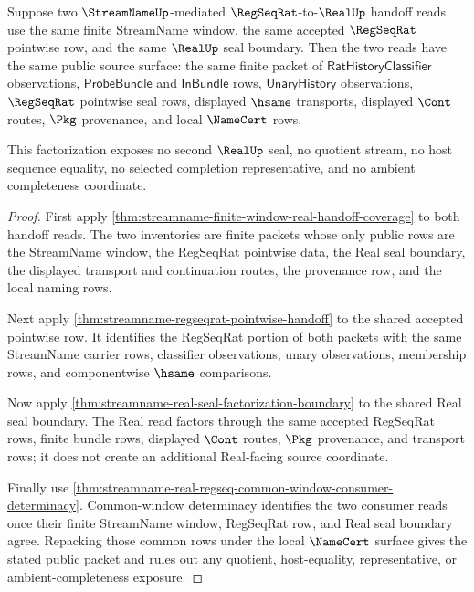 \begin{theorem}
\label{thm:streamname-regseqrat-real-window-factorization}
Suppose two $\StreamNameUp$-mediated $\RegSeqRat$-to-$\RealUp$ handoff reads use the same finite StreamName window, the same accepted $\RegSeqRat$ pointwise row, and the same $\RealUp$ seal boundary. Then the two reads have the same public source surface: the same finite packet of $\mathsf{RatHistoryClassifier}$ observations, $\mathsf{ProbeBundle}$ and $\mathsf{InBundle}$ rows, $\mathsf{UnaryHistory}$ observations, $\RegSeqRat$ pointwise seal rows, displayed $\hsame$ transports, displayed $\Cont$ routes, $\Pkg$ provenance, and local $\NameCert$ rows.

This factorization exposes no second $\RealUp$ seal, no quotient stream, no host sequence equality, no selected completion representative, and no ambient completeness coordinate.
\end{theorem}
\begin{proof}
First apply \autoref{thm:streamname-finite-window-real-handoff-coverage} to both handoff reads. The two inventories are finite packets whose only public rows are the StreamName window, the RegSeqRat pointwise data, the Real seal boundary, the displayed transport and continuation routes, the provenance row, and the local naming rows.

Next apply \autoref{thm:streamname-regseqrat-pointwise-handoff} to the shared accepted pointwise row. It identifies the RegSeqRat portion of both packets with the same StreamName carrier rows, classifier observations, unary observations, membership rows, and componentwise $\hsame$ comparisons.

Now apply \autoref{thm:streamname-real-seal-factorization-boundary} to the shared Real seal boundary. The Real read factors through the same accepted RegSeqRat rows, finite bundle rows, displayed $\Cont$ routes, $\Pkg$ provenance, and transport rows; it does not create an additional Real-facing source coordinate.

Finally use \autoref{thm:streamname-real-regseq-common-window-consumer-determinacy}. Common-window determinacy identifies the two consumer reads once their finite StreamName window, RegSeqRat row, and Real seal boundary agree. Repacking those common rows under the local $\NameCert$ surface gives the stated public packet and rules out any quotient, host-equality, representative, or ambient-completeness exposure.
\end{proof}

